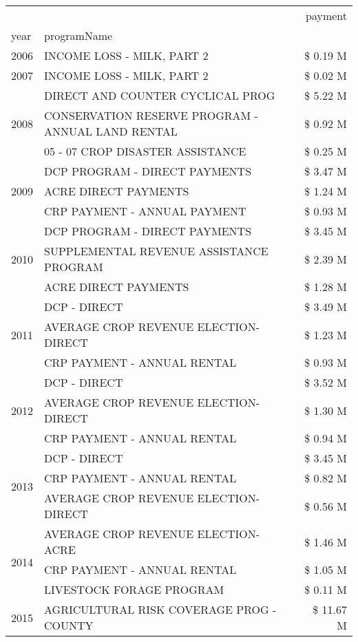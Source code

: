 \begin{tabular}{llr}
\toprule
 &  & payment \\
year & programName &  \\
\midrule
2006 & INCOME LOSS - MILK, PART 2 & \$ 0.19 M \\
\cline{1-3}
2007 & INCOME LOSS - MILK, PART 2 & \$ 0.02 M \\
\cline{1-3}
\multirow[t]{3}{*}{2008} & DIRECT AND COUNTER CYCLICAL PROG & \$ 5.22 M \\
 & CONSERVATION RESERVE PROGRAM - ANNUAL LAND RENTAL & \$ 0.92 M \\
 & 05 - 07 CROP DISASTER ASSISTANCE & \$ 0.25 M \\
\cline{1-3}
\multirow[t]{3}{*}{2009} & DCP PROGRAM - DIRECT PAYMENTS & \$ 3.47 M \\
 & ACRE DIRECT PAYMENTS & \$ 1.24 M \\
 & CRP PAYMENT - ANNUAL PAYMENT & \$ 0.93 M \\
\cline{1-3}
\multirow[t]{3}{*}{2010} & DCP PROGRAM - DIRECT PAYMENTS & \$ 3.45 M \\
 & SUPPLEMENTAL REVENUE ASSISTANCE PROGRAM & \$ 2.39 M \\
 & ACRE DIRECT PAYMENTS & \$ 1.28 M \\
\cline{1-3}
\multirow[t]{3}{*}{2011} & DCP - DIRECT & \$ 3.49 M \\
 & AVERAGE CROP REVENUE ELECTION-DIRECT & \$ 1.23 M \\
 & CRP PAYMENT - ANNUAL RENTAL & \$ 0.93 M \\
\cline{1-3}
\multirow[t]{3}{*}{2012} & DCP - DIRECT & \$ 3.52 M \\
 & AVERAGE CROP REVENUE ELECTION-DIRECT & \$ 1.30 M \\
 & CRP PAYMENT - ANNUAL RENTAL & \$ 0.94 M \\
\cline{1-3}
\multirow[t]{3}{*}{2013} & DCP - DIRECT & \$ 3.45 M \\
 & CRP PAYMENT - ANNUAL RENTAL & \$ 0.82 M \\
 & AVERAGE CROP REVENUE ELECTION-DIRECT & \$ 0.56 M \\
\cline{1-3}
\multirow[t]{3}{*}{2014} & AVERAGE CROP REVENUE ELECTION-ACRE & \$ 1.46 M \\
 & CRP PAYMENT - ANNUAL RENTAL & \$ 1.05 M \\
 & LIVESTOCK FORAGE PROGRAM & \$ 0.11 M \\
\cline{1-3}
\multirow[t]{3}{*}{2015} & AGRICULTURAL RISK COVERAGE PROG - COUNTY & \$ 11.67 M \\

\end{tabular}
